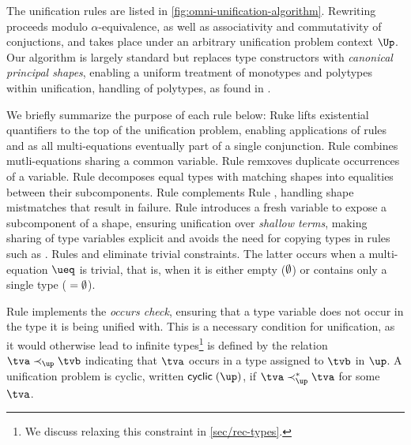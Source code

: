 \documentclass[acmsmall,screen,nonacm]{acmart}
\begin{document}

The unification rules are listed in
\cref{fig:omni-unification-algorithm}. Rewriting proceeds modulo
$\alpha$-equivalence, as well as associativity and commutativity of
conjuctions, and takes place under an arbitrary unification problem context
$\Up$.
%
Our algorithm is largely standard \cite{Pottier-Remy/emlti} but replaces
type constructors with \emph{canonical principal shapes}, enabling a uniform
treatment of monotypes and polytypes within unification,  handling of polytypes, as found
in \citep{Garrigue-Remy/poly-ml}.



We briefly summarize the purpose of each rule below: Ruke 
lifts existential quantifiers to the top of the unification problem,
enabling applications of rules  and  as all
multi-equations eventually part of a single conjunction. Rule 
combines mutli-equations sharing a common variable. Rule 
remxoves duplicate occurrences of a variable. Rule 
decomposes equal types with matching shapes into equalities between their
subcomponents. Rule  complements
Rule , handling shape mistmatches that result in failure.
Rule  introduces a fresh variable to expose a subcomponent of a shape,
ensuring unification over \emph{shallow terms}, making sharing of type
variables explicit and avoids the need for copying types in rules such as
. Rules  and  eliminate trivial
constraints. The latter occurs when a multi-equation $\ueq$ is trivial, that
is, when it is either empty ($\emptyset$) or contains only a single type (${\relax} = {\emptyset}$).


Rule  implements the \emph{occurs check}, ensuring that a type
variable does not occur in the type it is being unified with. This is a
necessary condition for unification, as it would otherwise lead to infinite
types\footnote{We discuss relaxing this constraint in \cref{sec/rec-types}.}
is defined by the relation $\tv \prec_\up \tvb$ indicating that $\tv$ occurs
in a type assigned to $\tvb$ in $\up$. A unification problem is cyclic,
written $\cyclic \up$, if $\tv \prec_\up^* \tv$ for some $\tv$.
\end{document}
